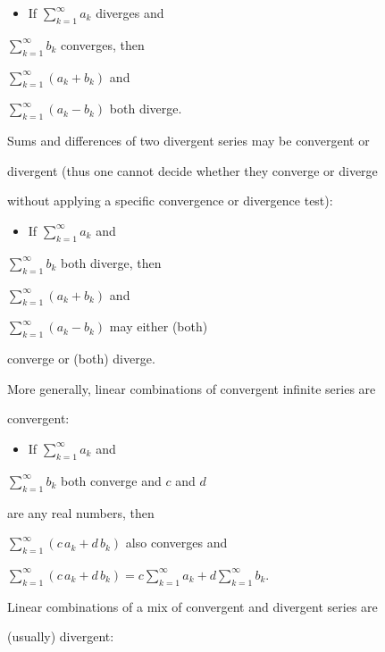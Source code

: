 \begin{itemize}
    \item If $\textstyle \sum _{k=1}^{\infty} a _k$ diverges and
\end{itemize}
    $\textstyle \sum _{k=1}^{\infty} b _k$ converges, then

    $\textstyle \sum _{k=1}^{\infty} (a _k+b _k)$ and

    $\textstyle \sum _{k=1}^{\infty} (a _k-b _k)$ both diverge.



Sums and differences of two divergent series may be convergent or

divergent (thus one cannot decide whether they converge or diverge

without applying a specific convergence or divergence test):



\begin{itemize}
    \item If $\textstyle \sum _{k=1}^{\infty} a _k$ and
\end{itemize}
    $\textstyle \sum _{k=1}^{\infty} b _k$ both diverge, then

    $\textstyle \sum _{k=1}^{\infty} (a _k+b _k)$ and

    $\textstyle \sum _{k=1}^{\infty} (a _k-b _k)$ may either (both)

    converge or (both) diverge.



More generally, linear combinations of convergent infinite series are

convergent:



\begin{itemize}
    \item If $\textstyle \sum _{k=1}^{\infty} a _k$ and
\end{itemize}
    $\textstyle \sum _{k=1}^{\infty} b _k$ both converge and $c$ and $d$

    are any real numbers, then

    $\textstyle \sum _{k=1}^{\infty} (c\,a _k+d\,b _k)$ also converges and

    $\textstyle \sum _{k=1}^{\infty} (c\,a _k+d\,b _k) = c \sum _{k=1}^{\infty} a _k + d \sum _{k=1}^{\infty} b _k.$



Linear combinations of a mix of convergent and divergent series are

(usually) divergent:



